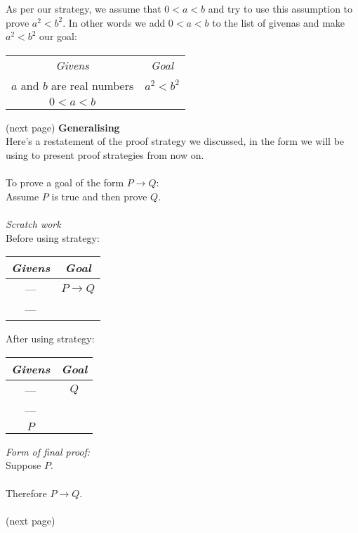\documentclass{report}
\theoremstyle{definition}
\begin{document}
As per our strategy, we assume that $0<a<b$ and try to use this assumption to prove $a^2<b^2$. In other words we add $0<a<b$ to the list of givenas and make $a^2<b^2$ our goal:
\begin{center}
\begin{tabular}{c|c}
\textit{Givens}&\textit{Goal}\\
$a$ and $b$ are real numbers&$a^2<b^2$\\
$0<a<b$&
\end{tabular}
\end{center}
(next page)\newpage
\noindent\textbf{Generalising}\\
Here's a restatement of the proof strategy we discussed, in the form we will be using to present proof strategies from now on.\\
\vspace{1mm}\\
\indent To prove a goal of the form $P\to Q$:\\
\indent Assume $P$ is true and then prove $Q$.\\
\vspace{1mm}\\
\textit{Scratch work}\\
Before using strategy:
\begin{center}
\begin{tabular}{c|c}
\textit{Givens}&\textit{Goal}\\
\hline
---&$P\to Q$\\
---&
\end{tabular}
\end{center}
After using strategy:
\begin{center}
\begin{tabular}{c|c}
\textit{Givens}&\textit{Goal}\\
\hline
---&$Q$\\
---&\\
$P$&
\end{tabular}
\end{center}
\textit{Form of final proof:}\\
\indent Suppose $P$.\\
\indent{}\\
\indent Therefore $P\to Q$.\\
\vspace{1mm}\\
(next page)\newpage
\end{document}

